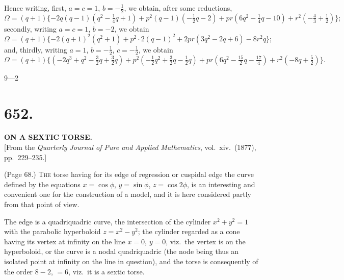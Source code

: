\documentclass[11pt,a4paper]{article}
\begin{document}
Hence writing, first, $a = c = 1$, $b = -\tfrac{1}{2}$, we obtain, after some reductions,
\[
\Omega = (q + 1)\{-2q(q - 1)(q^2 - \tfrac{1}{4}q + 1) + p^2 (q - 1)(-\tfrac{1}{2}q - 2) + pr(6q^2 - \tfrac{1}{4}q - 10) + r^2 (-\tfrac{4}{3} + \tfrac{1}{2})\};
\]
secondly, writing $a = c = 1$, $b = -2$, we obtain
\[
\Omega = (q + 1)\{-2(q + 1)^2 (q^2 + 1) + p^2 \cdot 2(q - 1)^2 + 2pr(3q^2 - 2q + 6) - 8r^2 q\};
\]
and, thirdly, writing $a = 1$, $b = -\tfrac{1}{2}$, $c = -\tfrac{1}{2}$, we obtain
\[
\Omega = (q + 1)\{(-2q^3 + q^2 - \tfrac{3}{2}q + \tfrac{3}{2}q) + p^2 (-\tfrac{1}{2}q^2 + \tfrac{3}{2}q - \tfrac{1}{2}q) + pr(6q^2 - \tfrac{15}{2}q - \tfrac{17}{4}) + r^2 (-8q + \tfrac{5}{2})\}.
\]

\hfill 9---2

\bigskip


\section*{652.}

\begin{center}
\textbf{ON A SEXTIC TORSE.}\\[1em]
[From the \textit{Quarterly Journal of Pure and Applied Mathematics}, vol.~xiv.\ (1877), pp.~229--235.]
\end{center}

\medskip

\noindent (Page 68.) \textsc{The} torse having for its edge of regression or cuspidal edge the curve defined by the equations $x = \cos\phi$, $y = \sin\phi$, $z = \cos 2\phi$, is an interesting and convenient one for the construction of a model, and it is here considered partly from that point of view.

The edge is a quadriquadric curve, the intersection of the cylinder $x^2 + y^2 = 1$ with the parabolic hyperboloid $z = x^2 - y^2$; the cylinder regarded as a cone having its vertex at infinity on the line $x = 0$, $y = 0$, viz.\ the vertex is on the hyperboloid, or the curve is a nodal quadriquadric (the node being thus an isolated point at infinity on the line in question), and the torse is consequently of the order $8 - 2$, $= 6$, viz.\ it is a sextic torse.
\end{document}
